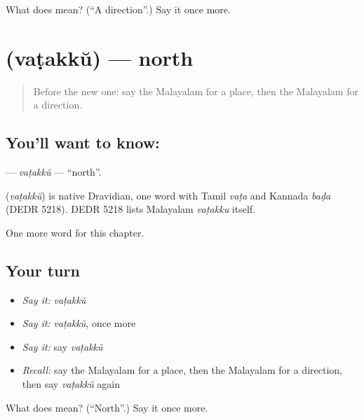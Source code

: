 \begin{tcolorbox}[breakable,colback=teal!4,colframe=teal!35!black,title={Before you move on}]
What does  mean? (\textquotedblleft{}A direction\textquotedblright{}.) Say it once more.
\end{tcolorbox}
\section[\texorpdfstring{\ml{വടക്ക്} (vaṭakkŭ)}{വടക്ക് (vaṭakkŭ)}]{ (vaṭakkŭ) — north}

\label{lesson:ML-C315-vatakku}



\begin{quote}
Before the new one: say the Malayalam for a place, then the Malayalam for a direction.
\end{quote}

\subsection*{You'll want to know: }
\textbf{} — \emph{vaṭakkŭ} — \textquotedblleft{}north\textquotedblright{}.

\begin{cousinweb}
\textbf{} (\emph{vaṭakkŭ}) is native Dravidian, one word with Tamil \emph{vaṭa} and Kannada \emph{baḍa} (DEDR 5218). DEDR 5218 lists Malayalam \emph{vaṭakku} itself.
\end{cousinweb}

\begin{grammarlens}[title={What you've built}]
One more word for this chapter.
\end{grammarlens}

\subsection*{Your turn}
\begin{itemize}
\raggedright
  \item \emph{Say it:} \emph{vaṭakkŭ}
  \item \emph{Say it:} \emph{vaṭakkŭ}, once more
  \item \emph{Say it:} say \emph{vaṭakkŭ}
  \item \emph{Recall:} say the Malayalam for a place, then the Malayalam for a direction, then say \emph{vaṭakkŭ} again
\end{itemize}

\begin{tcolorbox}[breakable,colback=teal!4,colframe=teal!35!black,title={Before you move on}]
What does  mean? (\textquotedblleft{}North\textquotedblright{}.) Say it once more.
\end{tcolorbox}
